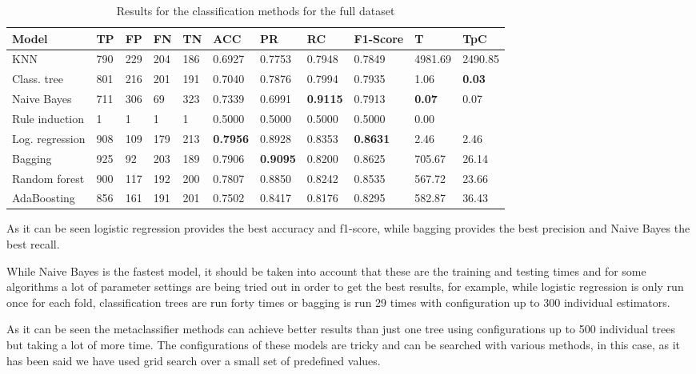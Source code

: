 \documentclass[a4paper,11pt]{article}
\begin{document}
\begin{table}
\centering

\begin{tabular}{|l|l|l|l|l|l|l|l|l|l|l|}
\hline

\textbf{Model} & \textbf{TP} & \textbf{FP} & \textbf{FN} & \textbf{TN} & \textbf{ACC} & \textbf{PR} & \textbf{RC} & \textbf{F1-Score} & \textbf{T} & \textbf{TpC} \\ \hline
KNN & 790 & 229 & 204 & 186 & 0.6927 & 0.7753 & 0.7948 & 0.7849 & 4981.69 & 2490.85 \\ \hline
Class. tree & 801 & 216 & 201 & 191 & 0.7040 & 0.7876 & 0.7994 & 0.7935 & 1.06 & \textbf{0.03} \\ \hline
Naive Bayes & 711 & 306 & 69 & 323 & 0.7339 & 0.6991 & \textbf{0.9115} & 0.7913 & \textbf{0.07} & 0.07 \\ \hline
Rule induction & 1 & 1 & 1 & 1 & 0.5000 & 0.5000 & 0.5000 & 0.5000 & 0.00 \\ \hline
Log. regression & 908 & 109 & 179 & 213 & \textbf{0.7956} & 0.8928 & 0.8353 & \textbf{0.8631} & 2.46 & 2.46 \\ \hline
Bagging & 925 & 92 & 203 & 189 & 0.7906 & \textbf{0.9095} & 0.8200 & 0.8625 & 705.67 & 26.14 \\ \hline
Random forest & 900 & 117 & 192 & 200 & 0.7807 & 0.8850 & 0.8242 & 0.8535 & 567.72 & 23.66 \\ \hline
AdaBoosting & 856 & 161 & 191 & 201 & 0.7502 & 0.8417 & 0.8176 & 0.8295 & 582.87 & 36.43 \\ \hline

\end{tabular}
\caption{Results for the classification methods for the full dataset}
\label{class:full}
\end{table}

As it can be seen logistic regression provides the best accuracy and f1-score, while bagging provides the best precision and Naive Bayes the best recall. 

While Naive Bayes is the fastest model, it should be taken into account that these are the training and testing times and for some algorithms a lot of parameter settings are being tried out in order to get the best results, for example, while logistic regression is only run once for each fold, classification trees are run forty times or bagging is run 29 times with configuration up to 300 individual estimators.

As it can be seen the metaclassifier methods can achieve better results than just one tree using configurations up to 500 individual trees but taking a lot of more time. The configurations of these models are tricky and can be searched with various methods, in this case, as it has been said we have used grid search over a small set of predefined values.
\end{document}
